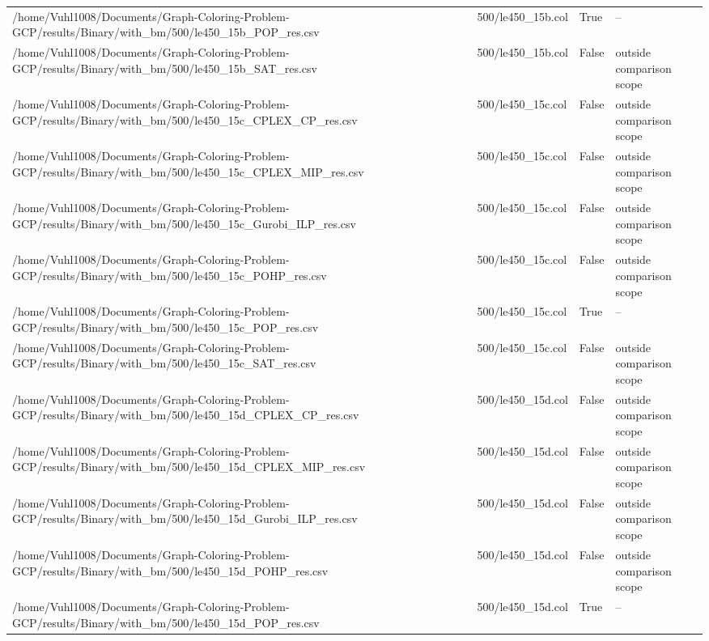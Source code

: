 \begin{table}[htbp]
\begin{tabular}{llll}
/home/Vuhl1008/Documents/Graph-Coloring-Problem-GCP/results/Binary/with\_bm/500/le450\_15b\_POP\_res.csv & 500/le450\_15b.col & True & -- \\
/home/Vuhl1008/Documents/Graph-Coloring-Problem-GCP/results/Binary/with\_bm/500/le450\_15b\_SAT\_res.csv & 500/le450\_15b.col & False & outside comparison scope \\
/home/Vuhl1008/Documents/Graph-Coloring-Problem-GCP/results/Binary/with\_bm/500/le450\_15c\_CPLEX\_CP\_res.csv & 500/le450\_15c.col & False & outside comparison scope \\
/home/Vuhl1008/Documents/Graph-Coloring-Problem-GCP/results/Binary/with\_bm/500/le450\_15c\_CPLEX\_MIP\_res.csv & 500/le450\_15c.col & False & outside comparison scope \\
/home/Vuhl1008/Documents/Graph-Coloring-Problem-GCP/results/Binary/with\_bm/500/le450\_15c\_Gurobi\_ILP\_res.csv & 500/le450\_15c.col & False & outside comparison scope \\
/home/Vuhl1008/Documents/Graph-Coloring-Problem-GCP/results/Binary/with\_bm/500/le450\_15c\_POHP\_res.csv & 500/le450\_15c.col & False & outside comparison scope \\
/home/Vuhl1008/Documents/Graph-Coloring-Problem-GCP/results/Binary/with\_bm/500/le450\_15c\_POP\_res.csv & 500/le450\_15c.col & True & -- \\
/home/Vuhl1008/Documents/Graph-Coloring-Problem-GCP/results/Binary/with\_bm/500/le450\_15c\_SAT\_res.csv & 500/le450\_15c.col & False & outside comparison scope \\
/home/Vuhl1008/Documents/Graph-Coloring-Problem-GCP/results/Binary/with\_bm/500/le450\_15d\_CPLEX\_CP\_res.csv & 500/le450\_15d.col & False & outside comparison scope \\
/home/Vuhl1008/Documents/Graph-Coloring-Problem-GCP/results/Binary/with\_bm/500/le450\_15d\_CPLEX\_MIP\_res.csv & 500/le450\_15d.col & False & outside comparison scope \\
/home/Vuhl1008/Documents/Graph-Coloring-Problem-GCP/results/Binary/with\_bm/500/le450\_15d\_Gurobi\_ILP\_res.csv & 500/le450\_15d.col & False & outside comparison scope \\
/home/Vuhl1008/Documents/Graph-Coloring-Problem-GCP/results/Binary/with\_bm/500/le450\_15d\_POHP\_res.csv & 500/le450\_15d.col & False & outside comparison scope \\
/home/Vuhl1008/Documents/Graph-Coloring-Problem-GCP/results/Binary/with\_bm/500/le450\_15d\_POP\_res.csv & 500/le450\_15d.col & True & -- \\

\end{tabular}
\end{table}
